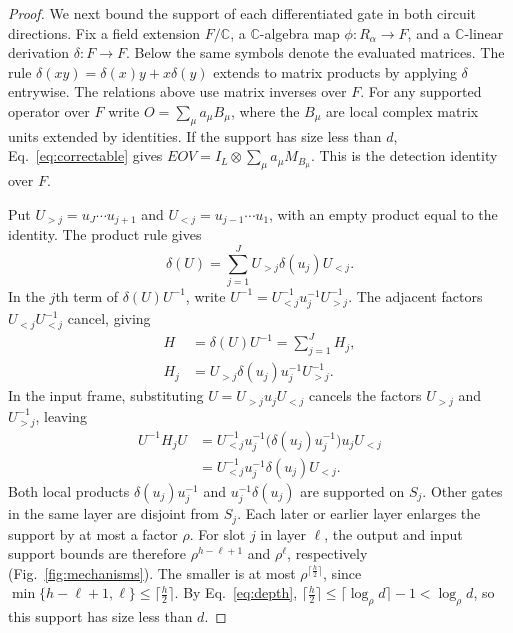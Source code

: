 \documentclass[aps,prl,reprint,notitlepage,nofootinbib,nobibnotes]{revtex4-2}
\newcommand{\id}{I}
\begin{document}
\begin{proof}
We next bound the support of each differentiated gate in both circuit directions.
Fix a field extension \(F/\mathbb C\), a \(\mathbb C\)-algebra map
\(\phi:R_\alpha\to F\), and a \(\mathbb C\)-linear derivation
\(\delta:F\to F\). Below the same symbols denote the evaluated
matrices. The rule \(\delta(xy)=\delta(x)y+x\delta(y)\) extends to
matrix products by applying \(\delta\) entrywise. The relations above
use matrix inverses over \(F\). For any supported operator over \(F\)
write \(O=\sum_\mu a_\mu B_\mu\), where the \(B_\mu\) are local
complex matrix units extended by identities. If the support has
size less than \(d\), Eq.~\eqref{eq:correctable} gives
\(EOV=\id_L\otimes\sum_\mu a_\mu M_{B_\mu}\). This is the detection
identity over \(F\).

Put \(U_{>j}=u_J\cdots u_{j+1}\) and \(U_{<j}=u_{j-1}\cdots u_1\),
with an empty product equal to the identity. The product rule gives
\[
 \delta(U)=\sum_{j=1}^J U_{>j}\delta(u_j)U_{<j}.
\]
In the \(j\)th term of \(\delta(U)U^{-1}\), write
\(U^{-1}=U_{<j}^{-1}u_j^{-1}U_{>j}^{-1}\).
The adjacent factors \(U_{<j}U_{<j}^{-1}\) cancel, giving
\begin{equation}\label{eq:generator}
 \begin{aligned}
 H&=\delta(U)U^{-1}=\sum_{j=1}^J H_j,\\
 H_j&=U_{>j}\delta(u_j)u_j^{-1}U_{>j}^{-1}.
 \end{aligned}
\end{equation}
In the input frame, substituting \(U=U_{>j}u_jU_{<j}\) cancels
the factors \(U_{>j}\) and \(U_{>j}^{-1}\), leaving
\[
 \begin{aligned}
 U^{-1}H_jU
 &=U_{<j}^{-1}u_j^{-1}\bigl(\delta(u_j)u_j^{-1}\bigr)u_jU_{<j}\\
 &=U_{<j}^{-1}u_j^{-1}\delta(u_j)U_{<j}.
 \end{aligned}
\]
Both local products \(\delta(u_j)u_j^{-1}\) and \(u_j^{-1}\delta(u_j)\)
are supported on \(S_j\). Other gates in the same layer are
disjoint from \(S_j\). Each later or earlier layer enlarges the
support by at most a factor \(\rho\). For slot \(j\) in layer
\(\ell\), the output and input support bounds are therefore
\(\rho^{h-\ell+1}\) and \(\rho^\ell\), respectively (Fig.~\ref{fig:mechanisms}).
The smaller is at most \(\rho^{\lceil \frac{h}{2}\rceil}\), since
\(\min\{h-\ell+1,\ell\}\le\lceil\frac{h}{2}\rceil\).
By Eq.~\eqref{eq:depth}, \(\lceil\frac{h}{2}\rceil\le
\lceil\log_\rho d\rceil-1<\log_\rho d\), so this support has size
less than \(d\).


\end{proof}
\end{document}
